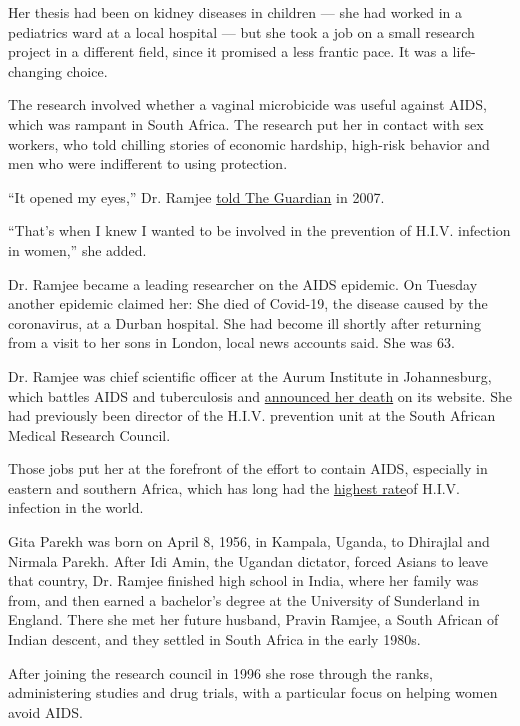 Her thesis had been on kidney diseases in children --- she had worked in
a pediatrics ward at a local hospital --- but she took a job on a small
research project in a different field, since it promised a less frantic
pace. It was a life-changing choice.

The research involved whether a vaginal microbicide was useful against
AIDS, which was rampant in South Africa. The research put her in contact
with sex workers, who told chilling stories of economic hardship,
high-risk behavior and men who were indifferent to using protection.

``It opened my eyes,'' Dr. Ramjee
\href{https://www.theguardian.com/education/2007/may/08/research.science}{told
The Guardian} in 2007.

``That's when I knew I wanted to be involved in the prevention of H.I.V.
infection in women,'' she added.

Dr. Ramjee became a leading researcher on the AIDS epidemic. On Tuesday
another epidemic claimed her: She died of Covid-19, the disease caused
by the coronavirus, at a Durban hospital. She had become ill shortly
after returning from a visit to her sons in London, local news accounts
said. She was 63.

Dr. Ramjee was chief scientific officer at the Aurum Institute in
Johannesburg, which battles AIDS and tuberculosis and
\href{https://www.auruminstitute.org/about-aurum/news-updates/aurum-news/125-the-aurum-institute-saddened-by-the-death-of-professor-gita-ramjee}{announced
her death} on its website. She had previously been director of the
H.I.V. prevention unit at the South African Medical Research Council.

Those jobs put her at the forefront of the effort to contain AIDS,
especially in eastern and southern Africa, which has long had the
\href{https://www.avert.org/professionals/hiv-around-world/sub-saharan-africa/overview}{highest
rate}of H.I.V. infection in the world.

Gita Parekh was born on April 8, 1956, in Kampala, Uganda, to Dhirajlal
and Nirmala Parekh. After Idi Amin, the Ugandan dictator, forced Asians
to leave that country, Dr. Ramjee finished high school in India, where
her family was from, and then earned a bachelor's degree at the
University of Sunderland in England. There she met her future husband,
Pravin Ramjee, a South African of Indian descent, and they settled in
South Africa in the early 1980s.

After joining the research council in 1996 she rose through the ranks,
administering studies and drug trials, with a particular focus on
helping women avoid AIDS.

